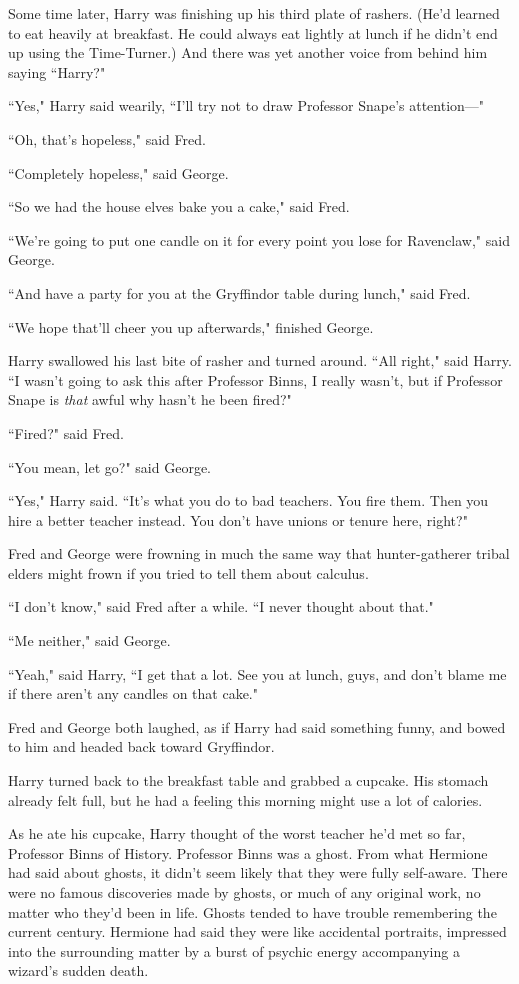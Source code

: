 Some time later, Harry was finishing up his third plate of rashers. (He'd learned to eat heavily at breakfast. He could always eat lightly at lunch if he didn't end up using the Time-Turner.) And there was yet another voice from behind him saying ``Harry?"

``Yes," Harry said wearily, ``I'll try not to draw Professor Snape's attention—"

``Oh, that's hopeless," said Fred.

``Completely hopeless," said George.

``So we had the house elves bake you a cake," said Fred.

``We're going to put one candle on it for every point you lose for Ravenclaw," said George.

``And have a party for you at the Gryffindor table during lunch," said Fred.

``We hope that'll cheer you up afterwards," finished George.

Harry swallowed his last bite of rasher and turned around. ``All right," said Harry. ``I wasn't going to ask this after Professor Binns, I really wasn't, but if Professor Snape is \emph{that} awful why hasn't he been fired?"

``Fired?" said Fred.

``You mean, let go?" said George.

``Yes," Harry said. ``It's what you do to bad teachers. You fire them. Then you hire a better teacher instead. You don't have unions or tenure here, right?"

Fred and George were frowning in much the same way that hunter-gatherer tribal elders might frown if you tried to tell them about calculus.

``I don't know," said Fred after a while. ``I never thought about that."

``Me neither," said George.

``Yeah," said Harry, ``I get that a lot. See you at lunch, guys, and don't blame me if there aren't any candles on that cake."

Fred and George both laughed, as if Harry had said something funny, and bowed to him and headed back toward Gryffindor.

Harry turned back to the breakfast table and grabbed a cupcake. His stomach already felt full, but he had a feeling this morning might use a lot of calories.

As he ate his cupcake, Harry thought of the worst teacher he'd met so far, Professor Binns of History. Professor Binns was a ghost. From what Hermione had said about ghosts, it didn't seem likely that they were fully self-aware. There were no famous discoveries made by ghosts, or much of any original work, no matter who they'd been in life. Ghosts tended to have trouble remembering the current century. Hermione had said they were like accidental portraits, impressed into the surrounding matter by a burst of psychic energy accompanying a wizard's sudden death.

